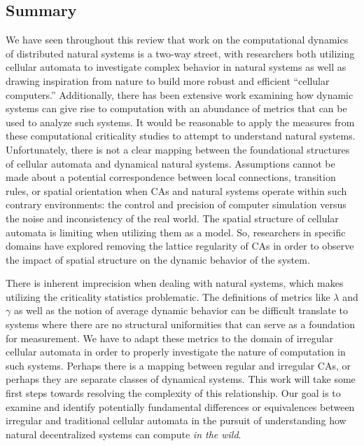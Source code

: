\documentclass[a4paper,11pt]{article}
\begin{document}
\subsection{Summary}
\label{sec:PrevSum} 

We have seen throughout this review that work on the computational dynamics of distributed natural systems is a two-way street, 
with researchers both utilizing cellular automata to investigate complex behavior in natural systems as well as drawing inspiration from nature to build more robust and efficient ``cellular computers.'' Additionally, there has been extensive work examining how dynamic systems can give rise to computation with an abundance of metrics that can be used to analyze such systems. It would be reasonable to apply the measures from these computational criticality studies to attempt to understand natural systems. Unfortunately, there is not a clear mapping between the foundational structures of cellular automata and dynamical natural systems. Assumptions cannot be made about a potential correspondence between local connections, transition rules, or spatial orientation when CAs and natural systems operate within such contrary environments: the control and precision of computer simulation versus the noise and inconsistency of the real world. The spatial structure of cellular automata is limiting when utilizing them as a model. So, researchers in specific domains have explored removing the lattice regularity of CAs in order to observe the impact of spatial structure on the dynamic behavior of the system.

There is inherent imprecision when dealing with natural systems, which makes utilizing the criticality statistics problematic. The definitions of metrics like $\lambda$ and $\gamma$ as well as the notion of average dynamic behavior can be difficult translate to systems where there are no structural uniformities that can serve as a foundation for measurement. We have to adapt these metrics to the domain of irregular cellular automata in order to properly investigate the nature of computation in such systems. Perhaps there is a mapping between regular and irregular CAs, or perhaps they are separate classes of dynamical systems. This work will take some first steps towards resolving the complexity of this relationship. Our goal is to examine and identify potentially fundamental differences or equivalences between irregular and traditional cellular automata in the pursuit of understanding how natural decentralized systems can compute \textit{in the wild}.
\end{document}
